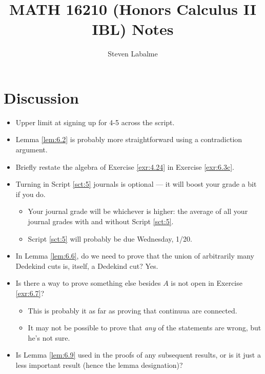 \documentclass{report}
\title{MATH 16210 (Honors Calculus II IBL) Notes}
\author{Steven Labalme}
\begin{document}
\maketitle



\tableofcontents
\newpage



\pagestyle{main}
\renewcommand{\chaptermark}[1]{\markboth{\chaptername\ \thechapter}{}}
\setcounter{chapter}{5}



\section{Discussion}
\begin{itemize}
    \item {}Upper limit at signing up for 4-5 across the script.
    \item Lemma \ref{lem:6.2} is probably more straightforward using a contradiction argument.
    \item Briefly restate the algebra of Exercise \ref{exr:4.24} in Exercise \ref{exr:6.3c}.
    \item {}Turning in Script \ref{sct:5} journals is optional --- it will boost your grade a bit if you do.
    \begin{itemize}
        \item Your journal grade will be whichever is higher: the average of all your journal grades with and without Script \ref{sct:5}.
        \item Script \ref{sct:5} will probably be due Wednesday, 1/20.
    \end{itemize}
    \item In Lemma \ref{lem:6.6}, do we need to prove that the union of arbitrarily many Dedekind cuts is, itself, a Dedekind cut? Yes.
    \item {}Is there a way to prove something else besides $A$ is not open in Exercise \ref{exr:6.7}?
    \begin{itemize}
        \item This is probably it as far as proving that continuua are connected.
        \item It may not be possible to prove that \emph{any} of the statements are wrong, but he's not sure.
    \end{itemize}
    \item Is Lemma \ref{lem:6.9} used in the proofs of any subsequent results, or is it just a less important result (hence the lemma designation)?

\end{itemize}
\end{document}
